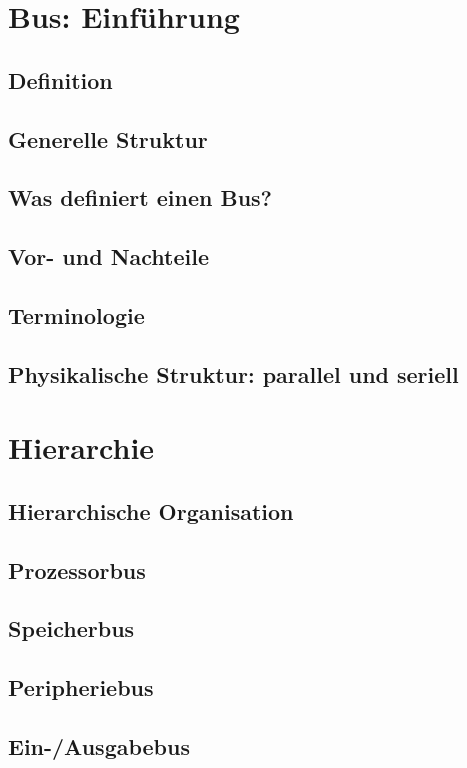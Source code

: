 \section{Bus: Einführung}
\subsection{Definition}
\subsection{Generelle Struktur}
\subsection*{Was definiert einen Bus?}
\subsection{Vor- und Nachteile}
\subsection{Terminologie}
\subsection{Physikalische Struktur: parallel und seriell}

\section{Hierarchie}
\subsection*{Hierarchische Organisation}
\subsection{Prozessorbus}
\subsection{Speicherbus}
\subsection{Peripheriebus}
\subsection{Ein-/Ausgabebus}


